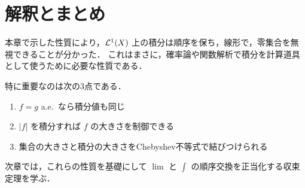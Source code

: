 \section{解釈とまとめ}

本章で示した性質により，$\mathcal L^1(X)$ 上の積分は順序を保ち，線形で，零集合を無視できることが分かった．
これはまさに，確率論や関数解析で積分を計算道具として使うために必要な性質である．

特に重要なのは次の3点である．
\begin{enumerate}
    \item $f=g$ a.e.\ なら積分値も同じ
    \item $|f|$ を積分すれば $f$ の大きさを制御できる
    \item 集合の大きさと積分の大きさをChebyshev不等式で結びつけられる
\end{enumerate}

次章では，これらの性質を基礎にして $\lim$ と $\int$ の順序交換を正当化する収束定理を学ぶ．
